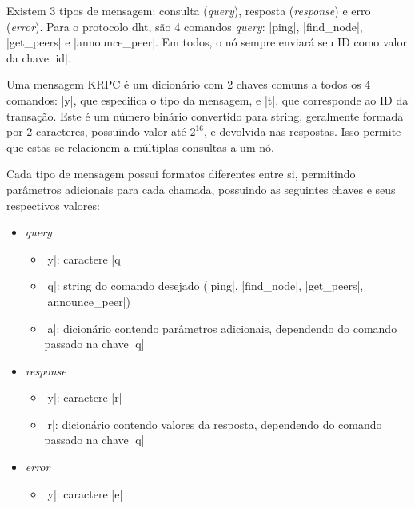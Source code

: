 \begin{itemize}
Existem 3 tipos de mensagem: consulta (\emph{query}), resposta (\emph{response}) e erro
(\emph{error}). Para o protocolo \gls*{dht}, são 4 comandos \emph{query}: \bverb|ping|,
\bverb|find_node|, \bverb|get_peers| e \bverb|announce_peer|. Em todos, o nó sempre
enviará seu ID como valor da chave \bverb|id|.

Uma mensagem KRPC é um dicionário com 2 chaves comuns a todos os 4 comandos: \bverb|y|,
que especifica o tipo da mensagem, e \bverb|t|, que corresponde ao ID da transação.
Este é um número binário convertido para \gls*{string}, geralmente formada por 2
caracteres, possuindo valor até $2^{16}$, e devolvida nas respostas. Isso permite que
estas se relacionem a múltiplas consultas a um nó.

Cada tipo de mensagem possui formatos diferentes entre si, permitindo parâmetros
adicionais para cada chamada, possuindo as seguintes chaves e seus respectivos valores:

\newpage
\begin{itemize}
    \item \emph{query}
        \begin{itemize}
            \item \bverb|y|: caractere \sverb|q|
            \item \bverb|q|: string do comando desejado (\sverb|ping|,
                \sverb|find_node|, \sverb|get_peers|, \sverb|announce_peer|)
            \item \bverb|a|: dicionário contendo parâmetros adicionais, dependendo do
                comando passado na chave \bverb|q|
        \end{itemize}

    \item \emph{response}
        \begin{itemize}
            \item \bverb|y|: caractere \sverb|r|
            \item \bverb|r|: dicionário contendo valores da resposta, dependendo do
                comando passado na chave \bverb|q|
        \end{itemize}

    \item \emph{error}
        \begin{itemize}
            \item \bverb|y|: caractere \sverb|e|


\end{itemize}
\end{itemize}
\end{itemize}
